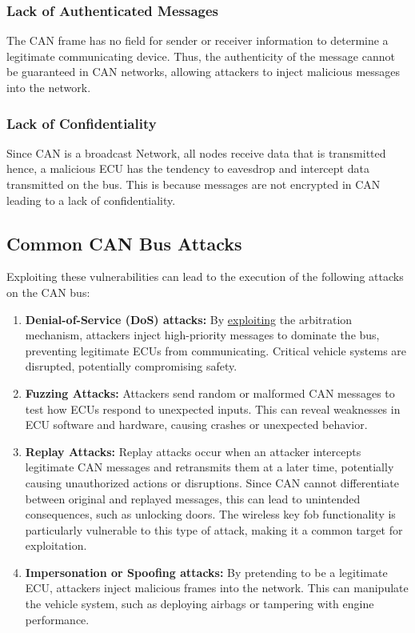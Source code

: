 \documentclass{report}
\begin{document}
\subsubsection{Lack of Authenticated Messages}
The CAN frame has no field for sender or receiver information to determine a legitimate communicating device. Thus, the authenticity of the message cannot be guaranteed in CAN networks, allowing attackers to inject malicious messages into the network.

\subsubsection{Lack of Confidentiality}
Since CAN is a broadcast Network, all nodes receive data that is transmitted hence, a malicious ECU has the tendency to eavesdrop and intercept data transmitted on the bus. This is because messages are not encrypted in CAN leading to a lack of confidentiality.

\subsection{Common CAN Bus Attacks}
Exploiting these vulnerabilities can lead to the execution of the following attacks on the CAN bus:

\begin{enumerate}
    \item \textbf{Denial-of-Service (DoS) attacks:} By \underline{exploiting} the arbitration mechanism, attackers inject high-priority messages to dominate the bus, preventing legitimate ECUs from communicating. Critical vehicle systems are disrupted, potentially compromising safety.
    \item \textbf{Fuzzing Attacks:} Attackers send random or malformed CAN messages to test how ECUs respond to unexpected inputs. This can reveal weaknesses in ECU software and hardware, causing crashes or unexpected behavior.
    \item \textbf{Replay Attacks:} Replay attacks occur when an attacker intercepts legitimate CAN messages and retransmits them at a later time, potentially causing unauthorized actions or disruptions. Since CAN cannot differentiate between original and replayed messages, this can lead to unintended consequences, such as unlocking doors. The wireless key fob functionality is particularly vulnerable to this type of attack, making it a common target for exploitation.
    \item \textbf{Impersonation or Spoofing attacks:} By pretending to be a legitimate ECU, attackers inject malicious frames into the network. This can manipulate the vehicle system, such as deploying airbags or tampering with engine performance.
\end{enumerate}
\end{document}
